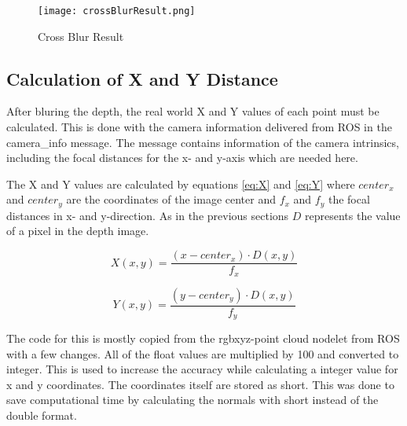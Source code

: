 \begin{figure}[H]
\begin{center}
  \texttt{[image: crossBlurResult.png]}
  \caption{Cross Blur Result}
  \label{figure:crossblurResult}
\end{center}
\end{figure} 


\subsection{Calculation of X and Y Distance}
After bluring the depth, the real world X and Y values of each point must be calculated. 
This is done with the camera information delivered from ROS in the camera\_info message.
The message contains information of the camera intrinsics, including the focal 
distances for the x- and y-axis which are needed here.

The X and Y values are calculated by equations \vref{eq:X} and \vref{eq:Y} where $center_x$ and $center_y$ are
the coordinates of the image center and $f_x$ and $f_y$ the focal distances in x- and y-direction. As in the
previous sections $D$ represents the value of a pixel in the depth image.

\begin{equation}
X(x,y)=\frac{(x-center_x) \cdot D(x,y)}{f_x}
\label{eq:X}
\end{equation}

\begin{equation}
Y(x,y)=\frac{(y-center_y) \cdot D(x,y)}{f_y}
\label{eq:Y}
\end{equation}

The code for this is mostly copied from the rgbxyz-point cloud nodelet from ROS with a few changes.
All of the float values are multiplied by 100 and converted to integer. This is used to increase the accuracy while
calculating a integer value for x and y coordinates. The coordinates itself are stored as short. This was done to save
computational time by calculating the normals with short instead of the double format.

